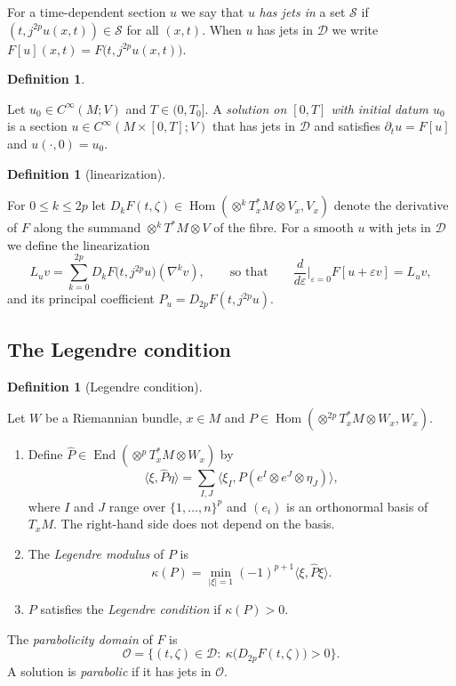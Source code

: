 \documentclass[11pt,reqno]{amsart}
\theoremstyle{definition}
\newtheorem{definition}[theorem]{Definition}
\theoremstyle{remark}
\newcommand{\Dom}{\mathcal{D}}
\newcommand{\Par}{\mathcal{O}}
\newcommand{\Hom}{\operatorname{Hom}}
\newcommand{\End}{\operatorname{End}}
\newcommand{\ip}[2]{\langle #1,#2\rangle}
\newcommand{\abs}[1]{\lvert #1\rvert}
\newcommand{\hatP}{\widehat{P}}
\newcommand{\lean}[1]{}
\newcommand{\uses}[1]{}
\numberwithin{equation}{section}
\begin{document}
For a time-dependent section $u$ we say that $u$ \emph{has jets in} a set $\mathcal S$ if
$(t,j^{2p}u(x,t))\in\mathcal S$ for all $(x,t)$. When $u$ has jets in $\Dom$ we write
$F[u](x,t)=F\bigl(t,j^{2p}u(x,t)\bigr)$.

\begin{definition}\label{def:solution}
\lean{ShortTime.JointlySmoothOn, ShortTime.EquationData.IsSolution, ShortTime.EquationData.IsParabolicSolution}
\uses{def:data, def:jet}
Let $u_0\in C^\infty(M;V)$ and $T\in(0,T_0]$. A \emph{solution on $[0,T]$ with initial datum $u_0$}
is a section $u\in C^\infty(M\times[0,T];V)$ that has jets in $\Dom$ and satisfies
$\partial_tu=F[u]$ and $u(\cdot,0)=u_0$.
\end{definition}

\begin{definition}[linearization]\label{def:linearization}
\lean{ShortTime.EquationData.partialDeriv, ShortTime.EquationData.principal}
\uses{def:data}
For $0\le k\le 2p$ let
$D_kF(t,\zeta)\in\Hom(\otimes^kT^*_xM\otimes V_x,V_x)$ denote the derivative of $F$ along the summand
$\otimes^kT^*M\otimes V$ of the fibre. For a smooth $u$ with jets in $\Dom$ we define the linearization
\begin{equation}\label{eq:linearization}
  L_u v=\sum_{k=0}^{2p}D_kF\bigl(t,j^{2p}u\bigr)(\nabla^kv),
  \qquad\text{so that}\qquad
  \frac{d}{d\varepsilon}\Big|_{\varepsilon=0}F[u+\varepsilon v]=L_uv,
\end{equation}
and its principal coefficient $P_u=D_{2p}F(t,j^{2p}u)$.
\end{definition}

\subsection{The Legendre condition}

\begin{definition}[Legendre condition]\label{def:legendre}
\lean{ShortTime.legendreForm, ShortTime.LegendreAt, ShortTime.EquationData.IsParabolicAt}
\uses{def:linearization}
Let $W$ be a Riemannian bundle, $x\in M$ and
$P\in\Hom(\otimes^{2p}T^*_xM\otimes W_x,W_x)$.
\begin{enumerate}[nosep]
\item Define $\hatP\in\End(\otimes^pT^*_xM\otimes W_x)$ by
  \[
    \ip{\xi}{\hatP\eta}=\sum_{I,J}\ip{\xi_I}{P(e^I\otimes e^J\otimes\eta_J)},
  \]
  where $I$ and $J$ range over $\{1,\dots,n\}^p$ and $(e_i)$ is an orthonormal basis of $T_xM$. The
  right-hand side does not depend on the basis.
\item The \emph{Legendre modulus} of $P$ is
  \[
    \kappa(P)=\min_{\abs{\xi}=1}(-1)^{p+1}\ip{\xi}{\hatP\xi}.
  \]
\item $P$ satisfies the \emph{Legendre condition} if $\kappa(P)>0$.
\end{enumerate}
The \emph{parabolicity domain} of $F$ is
\[
  \Par=\{(t,\zeta)\in\Dom:\ \kappa\bigl(D_{2p}F(t,\zeta)\bigr)>0\}.
\]
A solution is \emph{parabolic} if it has jets in $\Par$.
\end{definition}
\end{document}
